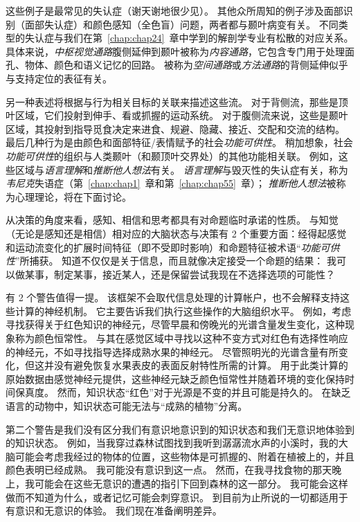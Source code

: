 这些例子是最常见的失认症（谢天谢地很少见）。
其他众所周知的例子涉及面部识别（面部失认症）和颜色感知（全色盲）问题，两者都与颞叶病变有关。
不同类型的失认症与我们在第~\ref{chap:chap24}~章中学到的解剖学专业有松散的对应关系。
具体来说，\textit{中枢视觉通路}腹侧延伸到颞叶被称为\textit{内容通路}，它包含专门用于处理面孔、物体、颜色和语义记忆的回路。
被称为\textit{空间通路}或\textit{方法通路}的背侧延伸似乎与支持定位的表征有关。


另一种表述将根据与行为相关目标的关联来描述这些流。
对于背侧流，那些是顶叶区域，它们投射到伸手、看或抓握的运动系统。
对于腹侧流来说，这些是颞叶区域，其投射到指导觅食决定来进食、规避、隐藏、接近、交配和交流的结构。
最后几种行为是由颜色和面部特征/表情赋予的社会\textit{功能可供性}。
稍加想象，社会\textit{功能可供性}的组织与人类颞叶（和颞顶叶交界处）的其他功能相关联。
例如，这些区域与\textit{语言理解}和\textit{推断他人想法}有关。
\textit{语言理解}与毁灭性的失认症有关，称为\textit{韦尼克}失语症（第~\ref{chap:chap1}~章和第~\ref{chap:chap55}~章）；
\textit{推断他人想法}被称为心理理论，将在下面讨论。


从决策的角度来看，感知、相信和思考都具有对命题临时承诺的性质。
与知觉（无论是感知还是相信）相对应的大脑状态与决策有 2 个重要方面：经得起感觉和运动流变化的扩展时间特征（即不受即时影响）和命题特征被术语“\textit{功能可供性}”所捕获。
知道不仅仅是关于信息，而且就像决定接受一个命题的结果：
我可以做某事，制定某事，接近某人，还是保留尝试我现在不选择选项的可能性？


有 2 个警告值得一提。
该框架不会取代信息处理的计算帐户，也不会解释支持这些计算的神经机制。
它主要告诉我们执行这些操作的大脑组织水平。
例如，考虑寻找获得关于红色知识的神经元，尽管早晨和傍晚光的光谱含量发生变化，这种现象称为颜色恒常性。
与其在感觉区域中寻找以这种不变方式对红色有选择性响应的神经元，不如寻找指导选择成熟水果的神经元。
尽管照明光的光谱含量有所变化，但这并没有避免恢复水果表皮的表面反射特性所需的计算。
用于此类计算的原始数据由感觉神经元提供，这些神经元缺乏颜色恒常性并随着环境的变化保持时间保真度。
然而，知识状态“红色”对于光源是不变的并且可能是持久的。
在缺乏语言的动物中，知识状态可能无法与“成熟的植物”分离。


第二个警告是我们没有区分我们有意识地意识到的知识状态和我们无意识地体验到的知识状态。
例如，当我穿过森林试图找到我听到潺潺流水声的小溪时，我的大脑可能会考虑我经过的物体的位置，这些物体是可抓握的、附着在植被上的，并且颜色表明已经成熟。
我可能没有意识到这一点。
然而，在我寻找食物的那天晚上，我可能会在这些无意识的遭遇的指引下回到森林的这一部分。
我可能会这样做而不知道为什么，或者记忆可能会刺穿意识。
到目前为止所说的一切都适用于有意识和无意识的体验。
我们现在准备阐明差异。



